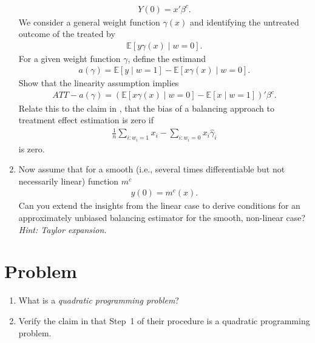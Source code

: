 \documentclass[a4paper]{scrartcl}
\newcommand{\E}{\mathbb{E}}
\begin{document}
\begin{enumerate}
{	} 
	\begin{align*}
		Y(0) = x' \beta^c.
	\end{align*}
	We consider a general weight function $\gamma(x)$ and identifying the untreated outcome of the treated by 
	\begin{align*}
		\E[y \gamma(x) \mid w = 0]. 
	\end{align*}
	For a given weight function $\gamma$, define the estimand 
	\begin{align*}
		a(\gamma) = \E[y \mid w = 1] - \E[x \gamma(x) \mid w = 0].
	\end{align*}
	Show that the linearity assumption implies
	\begin{align*}
		ATT - a(\gamma) = \left(\E[x \gamma(x) \mid w = 0] - \E[x \mid w = 1]\right)'\beta^{c}.
	\end{align*}
	Relate this to the claim in \textcite{athey2018approximate}, that the bias of a balancing approach to treatment effect estimation is zero if 
	\begin{align*}
		\frac{1}{n} \sum_{i: w_i = 1} x_i - \sum_{i: w_i = 0} x_i \hat{\gamma}_i
	\end{align*}
	is zero.
	\item Now assume that for a smooth (i.e., several times differentiable but not necessarily linear) function $m^c$
	\begin{align*}
		y(0) = m^c(x). 	
	\end{align*} 
	Can you extend the insights from the linear case to derive conditions for an approximately unbiased balancing estimator for the smooth, non-linear case? 
	\emph{Hint: Taylor expansion.}
\end{enumerate}


\section*{Problem~}

\begin{enumerate}
	\item What is a \emph{quadratic programming problem}?
	\item Verify the claim in \textcite{athey2018approximate} that Step~1 of their procedure is a quadratic programming problem.
\end{enumerate}
\end{document}
